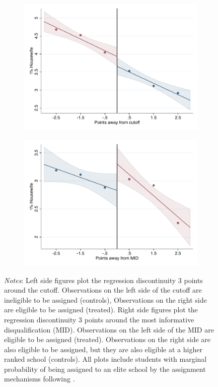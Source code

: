 \documentclass[oneside,11pt]{article}
\begin{document}
\begin{figure}[H]
\begin{center}
    \begin{subfigure}{0.475\textwidth}
        \centering
        \includegraphics[width=\textwidth]{04_Figures/rd_plot_tau_Housewife_UNAM3.pdf}
    \end{subfigure}
    \begin{subfigure}{0.475\textwidth}
        \centering
        \includegraphics[width=\textwidth]{04_Figures/rd_plot_mid_Housewife_UNAM3.pdf}
    \end{subfigure}
    \end{center}
    
\footnotesize
\textit{Notes}: Left side figures plot the regression discontinuity 3 points around the cutoff. Observations on the left side of the cutoff are ineligible to be assigned (controls), Observations on the right side are eligible to be assigned (treated). Right side figures plot the regression discontinuity 3 points around the most informative disqualification (MID). Observations on the left side of the MID are eligible to be assigned (treated). Observations on the right side are also eligible to be assigned, but they are also eligible at a higher ranked school (controls). All plots include students with marginal probability of being assigned to an elite school by the assignment mechanisms following \citet{abdulkadirouglu2022breaking}. 
\end{figure}
\end{document}
